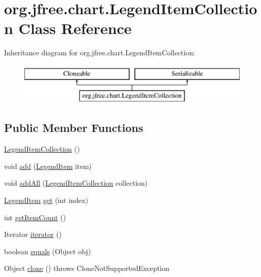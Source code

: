 \hypertarget{classorg_1_1jfree_1_1chart_1_1_legend_item_collection}{}\section{org.\+jfree.\+chart.\+Legend\+Item\+Collection Class Reference}
\label{classorg_1_1jfree_1_1chart_1_1_legend_item_collection}
Inheritance diagram for org.\+jfree.\+chart.\+Legend\+Item\+Collection\+:\begin{figure}[H]
\begin{center}
\leavevmode
\includegraphics[height=2.000000cm]{classorg_1_1jfree_1_1chart_1_1_legend_item_collection}
\end{center}
\end{figure}
\subsection*{Public Member Functions}
\begin{DoxyCompactItemize}
\item 
\mbox{\hyperlink{classorg_1_1jfree_1_1chart_1_1_legend_item_collection_a9f0e97c27e91e868e3b169b6f26e239a}{Legend\+Item\+Collection}} ()
\item 
void \mbox{\hyperlink{classorg_1_1jfree_1_1chart_1_1_legend_item_collection_ab68a7f73aed86fd28e1ead5756cec650}{add}} (\mbox{\hyperlink{classorg_1_1jfree_1_1chart_1_1_legend_item}{Legend\+Item}} item)
\item 
void \mbox{\hyperlink{classorg_1_1jfree_1_1chart_1_1_legend_item_collection_a2ac6bfa2369ab053474d03d90c86d822}{add\+All}} (\mbox{\hyperlink{classorg_1_1jfree_1_1chart_1_1_legend_item_collection}{Legend\+Item\+Collection}} collection)
\item 
\mbox{\hyperlink{classorg_1_1jfree_1_1chart_1_1_legend_item}{Legend\+Item}} \mbox{\hyperlink{classorg_1_1jfree_1_1chart_1_1_legend_item_collection_a79733bd1dd221da70a0d9090a1d9ce36}{get}} (int index)
\item 
int \mbox{\hyperlink{classorg_1_1jfree_1_1chart_1_1_legend_item_collection_ac24a3e4e29098c1bc37abd34d9cddbd4}{get\+Item\+Count}} ()
\item 
Iterator \mbox{\hyperlink{classorg_1_1jfree_1_1chart_1_1_legend_item_collection_a622118af323c29caa42b8657af1022b7}{iterator}} ()
\item 
boolean \mbox{\hyperlink{classorg_1_1jfree_1_1chart_1_1_legend_item_collection_aa45403fda9dff0fe7b9f1cfc462f5959}{equals}} (Object obj)
\item 
Object \mbox{\hyperlink{classorg_1_1jfree_1_1chart_1_1_legend_item_collection_a242722dd9371d7cca6dd5d0b4e7b25b2}{clone}} ()  throws Clone\+Not\+Supported\+Exception 
\end{DoxyCompactItemize}


